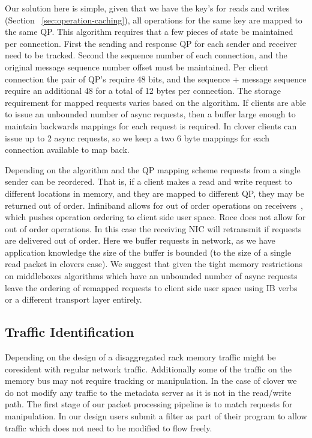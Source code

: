 Our solution here is simple, given that we have the key's for reads and writes
(Section ~\ref{sec:operation-caching}), all operations for the same key are
mapped to the same QP.  This algorithm requires that a few pieces of state be
maintained per connection.  First the sending and response QP for each sender
and receiver need to be tracked. Second the sequence number of each connection,
and the original message sequence number offset must be maintained. Per client
connection the pair of QP's require 48 bits, and the sequence + message sequence
require an additional 48 for a total of 12 bytes per connection. The storage
requirement for mapped requests varies based on the algorithm. If clients are
able to issue an unbounded number of async requests, then a buffer large enough
to maintain backwards mappings for each request is required. In clover clients
can issue up to 2 async requests, so we keep a two 6 byte mappings for each
connection available to map back. 

Depending on the algorithm and the QP mapping scheme requests from a single
sender can be reordered. That is, if a client makes a read and write request to
different locations in memory, and they are mapped to different QP, they may be
returned out of order. Infiniband allows for out of order operations on
receivers~\cite{infiniband-spec}, which pushes operation ordering to client
side user space. Roce does not allow for out of order operations. In this case
the receiving NIC will retransmit if requests are delivered out of order. Here
we buffer requests in network, as we have application knowledge the size of the
buffer is bounded (to the size of a single read packet in clovers case). We
suggest that given the tight memory restrictions on middleboxes algorithms which
have an unbounded number of async requests leave the ordering of remapped
requests to client side user space using IB verbs or a different transport layer
entirely.


\subsection{Traffic Identification} Depending on the design of a disaggregated
rack memory traffic might be coresident with regular network traffic.
Additionally some of the traffic on the memory bus may not require tracking or
manipulation. In the case of clover we do not modify any traffic to the metadata
server as it is not in the read/write path. The first stage of our packet
processing pipeline is to match requests for manipulation. In our design users
submit a filter as part of their program to allow traffic which does not need to
be modified to flow freely.

